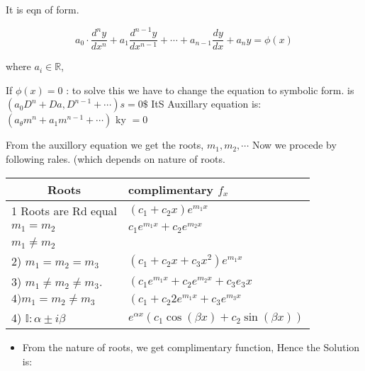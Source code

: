 
It is eqn of form.

$$
	a_{0} \cdot \frac{d^{n} y}{d x^{n}}+a_{1} \frac{d^{n-1} y}{d x^{n-1}}+\cdots+a_{n-1} \frac{d y}{d x}+a_{n} y=\phi(x)
$$

where $a_{i} \in \mathbb{R}$,

If $\phi(x)=0$ : to solve this we have to change the equation to symbolic form. is $\left(a_{0} D^{n}+D a, D^{n-1}+\cdots\right) s=0 \$$ ItS Auxillary equation is: $\left(a_{\theta} m^{n}+a_{1} m^{n-1}+\cdots\right)$ ky $=0$

From the auxillory equation we get the roots, $m_{1}, m_{2}, \cdots$ Now we procede by following rales. (which depends on nature of roots.

\begin{center}
	\begin{tabular}{|l|l|}
		\hline
		\multicolumn{1}{|c|}{Roots}         & complimentary $f_{x}$                                              \\
		\hline
		1 Roots are Rd equal                & $\left(c_{1}+c_{2} x\right) e^{m_{1} x}$                           \\
		$m_{1}=m_{2}$                       & $c_{1} e^{m_{1} x}+c_{2} e^{m_{2} x}$                              \\
		$m_{1} \neq m_{2}$                  &                                                                    \\
		2) $m_{1}=m_{2}=m_{3}$              & $\left(c_{1}+c_{2} x+c_{3} x^2 \right) e^{m_{1} x}$                \\
		3) $m_{1} \neq m_{2} \neq m_{3}$.   & $\left(c_{1} e^{m_{1} x}+c_{2} e^{m_{2} x}+c_{3} e_{3} x\right.$   \\
		$4) m_{1}=m_{2} \neq m_{3}$         & $\left(c_{1}+c_{2} 2 e^{m_{1} x}+c_{3} e^{m_{3} x}\right.$         \\
		4) $\mathbb{I}: \alpha \pm i \beta$ & $e^{\alpha x}\left(c_{1} \cos(\beta x)+c_{2} \sin(\beta x)\right)$ \\
		\hline
	\end{tabular}
\end{center}

\begin{itemize}
	\item From the nature of roots, we get complimentary function, Hence the Solution is:
\end{itemize}

